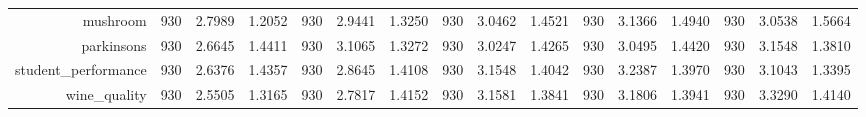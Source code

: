 \begin{table}[htbp]
{\begin{tabular}{rccccccccccccccc}
                  mushroom                            & 930                                     & \cellcolor[rgb]{ .776,  .937,  .808}\textcolor[rgb]{ 0,  .38,  0}{2.7989}          & 1.2052          & 930                             & 2.9441                                                                    & 1.3250          & 930                             & 3.0462          & 1.4521          & 930                             & 3.1366                                                                    & 1.4940          & 930                             & 3.0538                                                                    & 1.5664          \\
                  parkinsons                          & 930                                     & \cellcolor[rgb]{ .776,  .937,  .808}\textcolor[rgb]{ 0,  .38,  0}{2.6645}          & 1.4411          & 930                             & 3.1065                                                                    & 1.3272          & 930                             & 3.0247          & 1.4265          & 930                             & 3.0495                                                                    & 1.4420          & 930                             & 3.1548                                                                    & 1.3810          \\
                  student\_performance                & 930                                     & \cellcolor[rgb]{ .776,  .937,  .808}\textcolor[rgb]{ 0,  .38,  0}{2.6376}          & 1.4357          & 930                             & 2.8645                                                                    & 1.4108          & 930                             & 3.1548          & 1.4042          & 930                             & 3.2387                                                                    & 1.3970          & 930                             & 3.1043                                                                    & 1.3395          \\
                  wine\_quality                       & 930                                     & \cellcolor[rgb]{ .776,  .937,  .808}\textcolor[rgb]{ 0,  .38,  0}{2.5505}          & 1.3165          & 930                             & 2.7817                                                                    & 1.4152          & 930                             & 3.1581          & 1.3841          & 930                             & 3.1806                                                                    & 1.3941          & 930                             & 3.3290                                                                    & 1.4140          \\

\end{tabular}}
\end{table}
